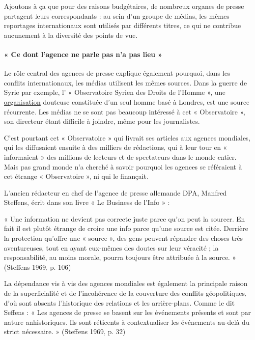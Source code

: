 Ajoutons à ça que pour des raisons budgétaires, de nombreux organes de
presse partagent leurs correspondants : au sein d'un groupe de médias,
les mêmes reportages internationaux sont utilisés par différents titres,
ce qui ne contribue aucunement à la diversité des points de vue.

\hypertarget{-ce-dont-lagence-ne-parle-pas-na-pas-lieu-}{%
\paragraph{« Ce dont l'agence ne parle pas n'a pas lieu
»}\label{-ce-dont-lagence-ne-parle-pas-na-pas-lieu-}}

Le rôle central des agences de presse explique également pourquoi, dans
les conflits internationaux, les médias utilisent les mêmes sources.
Dans la guerre de Syrie par exemple, l' « Observatoire Syrien des Droits
de l'Homme », une
\href{https://en.wikipedia.org/wiki/Syrian_Observatory_for_Human_Rights}{organisation}
douteuse constituée d'un seul homme basé à Londres, est une source
récurrente. Les médias ne se sont pas beaucoup intéressé à cet «
Observatoire », son directeur étant difficile à joindre, même pour les
journalistes.

C'est pourtant cet « Observatoire » qui livrait ses articles aux agences
mondiales, qui les diffusaient ensuite à des milliers de rédactions, qui
à leur tour en « informaient » des millions de lecteurs et de
spectateurs dans le monde entier. Mais pas grand monde n'a cherché à
savoir pourquoi les agences se référaient à cet étrange « Observatoire
», ni qui le finançait.

L'ancien rédacteur en chef de l'agence de presse allemande DPA, Manfred
Steffens, écrit dans son livre « Le Business de l'Info » :

« Une information ne devient pas correcte juste parce qu'on peut la
sourcer. En fait il est plutôt étrange de croire une info parce qu'une
source est citée. Derrière la protection qu'offre une « source », des
gens peuvent répandre des choses très aventureuses, tout en ayant
eux-mêmes des doutes sur leur véracité ; la responsabilité, au moins
morale, pourra toujours être attribuée à la source. » (Steffens 1969, p.
106)

La dépendance vis à vis des agences mondiales est également la
principale raison de la superficialité et de l'incohérence de la
couverture des conflits géopolitiques, d'où sont absents l'historique
des relations et les arrière-plans. Comme le dit Seffens : « Les agences
de presse se basent sur les événements présents et sont par nature
anhistoriques. Ils sont réticents à contextualiser les événements
au-delà du strict nécessaire. » (Steffens 1969, p. 32)

